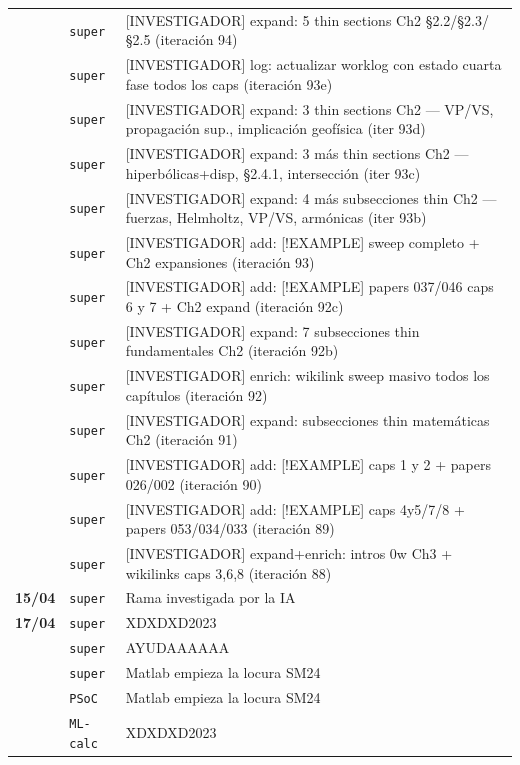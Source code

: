 \begin{longtable}{@{}p{1.7cm} p{1.5cm} p{12.2cm}@{}}
 & \texttt{\scriptsize super} & [INVESTIGADOR] expand: 5 thin sections Ch2 §2.2/§2.3/§2.5 (iteración 94) \\
 & \texttt{\scriptsize super} & [INVESTIGADOR] log: actualizar worklog con estado cuarta fase todos los caps (iteración 93e) \\
 & \texttt{\scriptsize super} & [INVESTIGADOR] expand: 3 thin sections Ch2 --- VP/VS, propagación sup., implicación geofísica (iter 93d) \\
 & \texttt{\scriptsize super} & [INVESTIGADOR] expand: 3 más thin sections Ch2 --- hiperbólicas+disp, §2.4.1, intersección (iter 93c) \\
 & \texttt{\scriptsize super} & [INVESTIGADOR] expand: 4 más subsecciones thin Ch2 --- fuerzas, Helmholtz, VP/VS, armónicas (iter 93b) \\
 & \texttt{\scriptsize super} & [INVESTIGADOR] add: [!EXAMPLE] sweep completo + Ch2 expansiones (iteración 93) \\
 & \texttt{\scriptsize super} & [INVESTIGADOR] add: [!EXAMPLE] papers 037/046 caps 6 y 7 + Ch2 expand (iteración 92c) \\
 & \texttt{\scriptsize super} & [INVESTIGADOR] expand: 7 subsecciones thin fundamentales Ch2 (iteración 92b) \\
 & \texttt{\scriptsize super} & [INVESTIGADOR] enrich: wikilink sweep masivo todos los capítulos (iteración 92) \\
 & \texttt{\scriptsize super} & [INVESTIGADOR] expand: subsecciones thin matemáticas Ch2 (iteración 91) \\
 & \texttt{\scriptsize super} & [INVESTIGADOR] add: [!EXAMPLE] caps 1 y 2 + papers 026/002 (iteración 90) \\
 & \texttt{\scriptsize super} & [INVESTIGADOR] add: [!EXAMPLE] caps 4y5/7/8 + papers 053/034/033 (iteración 89) \\
 & \texttt{\scriptsize super} & [INVESTIGADOR] expand+enrich: intros 0w Ch3 + wikilinks caps 3,6,8 (iteración 88) \\
\textbf{15/04} & \texttt{\scriptsize super} & Rama investigada por la IA \\
\textbf{17/04} & \texttt{\scriptsize super} & XDXDXD2023 \\
 & \texttt{\scriptsize super} & AYUDAAAAAA \\
 & \texttt{\scriptsize super} & Matlab empieza la locura SM24 \\
 & \texttt{\scriptsize PSoC} & Matlab empieza la locura SM24 \\
 & \texttt{\scriptsize ML-calc} & XDXDXD2023 \\

\end{longtable}
